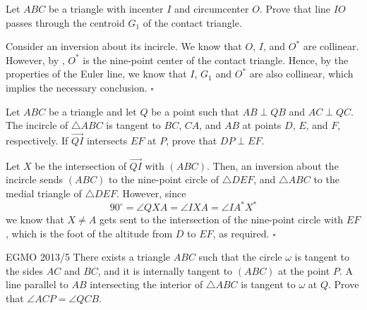 \documentclass{article}
\begin{document}
\begin{problem}[8.29]{}
Let $ABC$ be a triangle with incenter $I$ and circumcenter $O$. Prove that line $IO$ passes through the centroid $G_1$ of the contact triangle.
\end{problem}

Consider an inversion about its incircle. We know that $O$, $I$, and $O^*$ are collinear. However, by , $O^*$ is the nine-point center of the contact triangle. Hence, by the properties of the Euler line, we know that $I$, $G_1$ and $O^*$ are also collinear, which implies the necessary conclusion. $\square$

\begin{problem}[8.30]{}
Let $ABC$ be a triangle and let $Q$ be a point such that $AB \perp QB$ and $AC \perp QC$. The incircle of $\triangle ABC$ is tangent to $BC$, $CA$, and $AB$ at points $D$, $E$, and $F$, respectively. If $\overrightarrow{QI}$ intersects $EF$ at $P$, prove that $DP \perp EF$.
\end{problem}

Let $X$ be the intersection of $\overrightarrow{QI}$ with $(ABC)$. Then, an inversion about the incircle sends $(ABC)$ to the nine-point circle of $\triangle DEF$, and $\triangle ABC$ to the medial triangle of $\triangle DEF$. However, since \[90^\circ = \angle QXA = \angle IXA = \angle IA^*X^*\] we know that $X \neq A$ gets sent to the intersection of the nine-point circle with $EF$, which is the foot of the altitude from $D$ to $EF$, as required. $\square$

\begin{problem}[8.31]{EGMO 2013/5}
There exists a triangle $ABC$ such that the circle $\omega$ is tangent to the sides $AC$ and $BC$, and it is internally tangent to $(ABC)$ at the point $P$. A line parallel to $AB$ intersecting the interior of $\triangle ABC$ is tangent to $\omega$ at $Q$. Prove that $\angle ACP = \angle QCB$. 
\end{problem}
\end{document}

